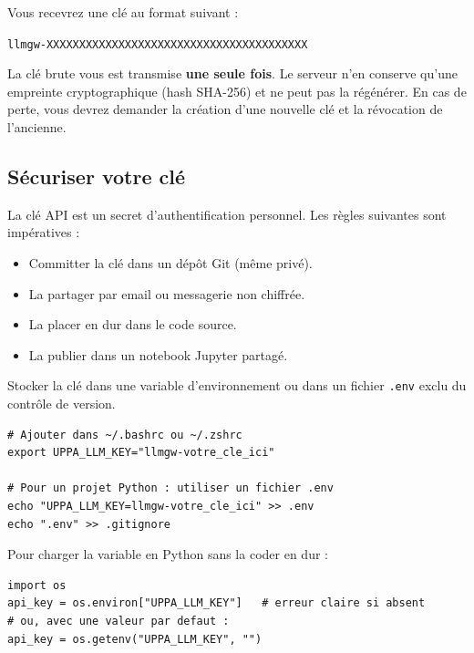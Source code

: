 \documentclass[12pt, a4paper, twoside]{article}
\begin{document}
Vous recevrez une clé au format suivant :
\begin{center}
  \texttt{llmgw-XXXXXXXXXXXXXXXXXXXXXXXXXXXXXXXXXXXXXXXX}
\end{center}

\begin{warning}
  La clé brute vous est transmise \textbf{une seule fois}. Le serveur n'en conserve qu'une
  empreinte cryptographique (hash SHA-256) et ne peut pas la régénérer. En cas de perte,
  vous devrez demander la création d'une nouvelle clé et la révocation de l'ancienne.
\end{warning}

\subsection{Sécuriser votre clé}

La clé API est un secret d'authentification personnel. Les règles suivantes sont impératives :

\begin{warning}[title={Ne jamais faire}]
  \begin{itemize}
    \item Committer la clé dans un dépôt Git (même privé).
    \item La partager par email ou messagerie non chiffrée.
    \item La placer en dur dans le code source.
    \item La publier dans un notebook Jupyter partagé.
  \end{itemize}
\end{warning}

\begin{tip}
  Stocker la clé dans une variable d'environnement ou dans un fichier \texttt{.env}
  exclu du contrôle de version.

\begin{lstlisting}[style=bashstyle, caption={Configuration de la variable d'environnement}]
# Ajouter dans ~/.bashrc ou ~/.zshrc
export UPPA_LLM_KEY="llmgw-votre_cle_ici"

# Pour un projet Python : utiliser un fichier .env
echo "UPPA_LLM_KEY=llmgw-votre_cle_ici" >> .env
echo ".env" >> .gitignore
\end{lstlisting}
\end{tip}

Pour charger la variable en Python sans la coder en dur :
\begin{lstlisting}[style=pythonstyle, caption={Lecture de la clé depuis l'environnement}]
import os
api_key = os.environ["UPPA_LLM_KEY"]   # erreur claire si absent
# ou, avec une valeur par defaut :
api_key = os.getenv("UPPA_LLM_KEY", "")
\end{lstlisting}
\end{document}
